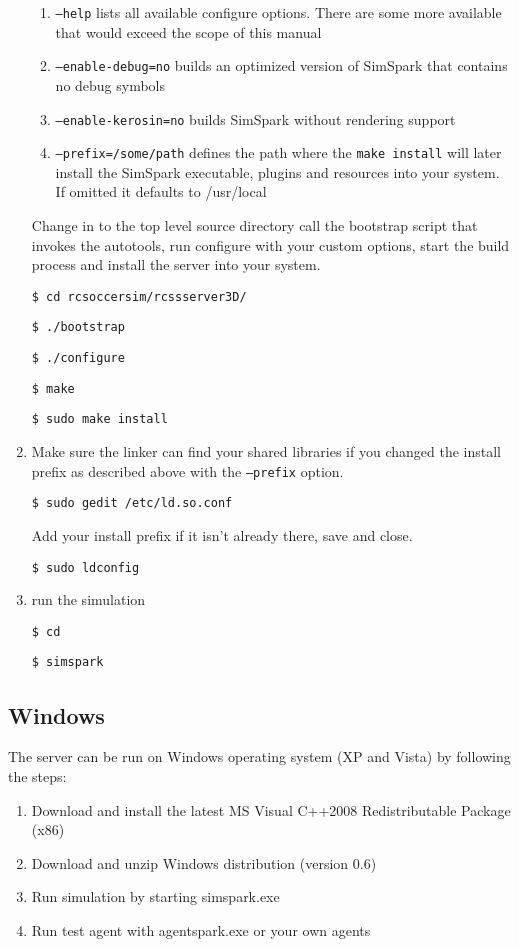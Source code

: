 \begin{enumerate}
\begin{enumerate}
\item \texttt{--help} lists all available configure options. There are some more available 
that would exceed the scope of this manual

\item \texttt{--enable-debug=no} builds an optimized version of SimSpark 
that contains no debug symbols

\item \texttt{--enable-kerosin=no} builds SimSpark without rendering support

\item \texttt{--prefix=/some/path} defines the path where the \texttt{make install} will later 
install the SimSpark executable, plugins and resources into your
system. If omitted it defaults to /usr/local

\end{enumerate}

Change in to the top level source directory call the bootstrap script
that invokes the autotools, run configure with your custom options,
start the build process and install the server into your system.

\texttt{\$ cd rcsoccersim/rcssserver3D/}

\texttt{\$ ./bootstrap}

\texttt{\$ ./configure}

\texttt{\$ make}

\texttt{\$ sudo make install}

\item Make sure the linker can find your shared libraries if you changed
the install prefix as described above with the \texttt{--prefix}
option.

\texttt{\$ sudo gedit /etc/ld.so.conf}

Add your install prefix if it isn't already there, save and close.

\texttt{\$ sudo ldconfig}

\item run the simulation

{\texttt{\$ cd}}

{\texttt{\$ simspark}}

\end{enumerate}

\subsection{Windows}
\label{sec:windowsinstall}
The server can be run on Windows operating system (XP and Vista) by following
the steps:
\begin{enumerate}
  \item Download and install the latest MS Visual C++2008 Redistributable Package (x86) 
  \item Download and unzip Windows distribution (version 0.6)
  \item Run simulation by starting simspark.exe
  \item Run test agent with agentspark.exe or your own agents 
\end{enumerate}

